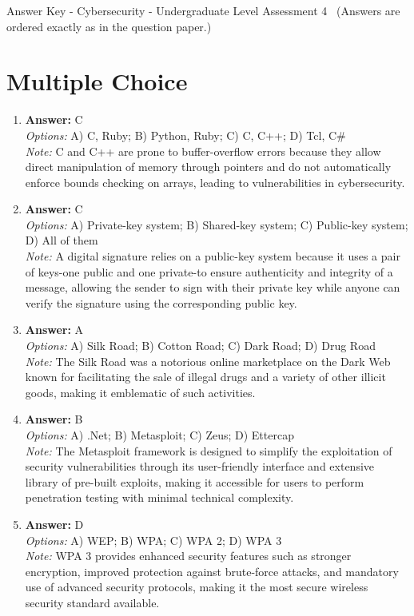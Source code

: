\documentclass[12pt]{article}
\begin{document}
\begin{center}
Answer Key - Cybersecurity - Undergraduate Level Assessment 4 \
\small (Answers are ordered exactly as in the question paper.)
\end{center}

\section*{Multiple Choice}
\begin{enumerate}[label=\arabic*.]
\item \textbf{Answer:} C
\\ \textit{Options:} A) C, Ruby; B) Python, Ruby; C) C, C++; D) Tcl, C\#
\\ \textit{Note:} C and C++ are prone to buffer-overflow errors because they allow direct manipulation of memory through pointers and do not automatically enforce bounds checking on arrays, leading to vulnerabilities in cybersecurity.
\item \textbf{Answer:} C
\\ \textit{Options:} A) Private-key system; B) Shared-key system; C) Public-key system; D) All of them
\\ \textit{Note:} A digital signature relies on a public-key system because it uses a pair of keys-one public and one private-to ensure authenticity and integrity of a message, allowing the sender to sign with their private key while anyone can verify the signature using the corresponding public key.
\item \textbf{Answer:} A
\\ \textit{Options:} A) Silk Road; B) Cotton Road; C) Dark Road; D) Drug Road
\\ \textit{Note:} The Silk Road was a notorious online marketplace on the Dark Web known for facilitating the sale of illegal drugs and a variety of other illicit goods, making it emblematic of such activities.
\item \textbf{Answer:} B
\\ \textit{Options:} A) .Net; B) Metasploit; C) Zeus; D) Ettercap
\\ \textit{Note:} The Metasploit framework is designed to simplify the exploitation of security vulnerabilities through its user-friendly interface and extensive library of pre-built exploits, making it accessible for users to perform penetration testing with minimal technical complexity.
\item \textbf{Answer:} D
\\ \textit{Options:} A) WEP; B) WPA; C) WPA 2; D) WPA 3
\\ \textit{Note:} WPA 3 provides enhanced security features such as stronger encryption, improved protection against brute-force attacks, and mandatory use of advanced security protocols, making it the most secure wireless security standard available.
\end{enumerate}
\end{document}
